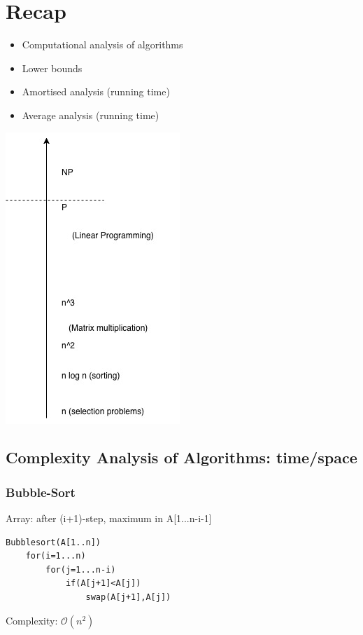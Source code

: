\section{Recap}
\begin{itemize}
\item Computational analysis of algorithms
\item  Lower bounds
\item  Amortised analysis (running time)
\item  Average analysis (running time)
\end{itemize}
\begin{center}
	\includegraphics[scale=0.5]{img/laufzeiten}
\end{center}


\subsection{Complexity Analysis of Algorithms: time/space}
\subsubsection{Bubble-Sort}

Array: after (i+1)-step, maximum in A[1...n-i-1]

\begin{verbatim}
Bubblesort(A[1..n])
    for(i=1...n)
        for(j=1...n-i)
            if(A[j+1]<A[j])
                swap(A[j+1],A[j])
\end{verbatim}
Complexity: $\mathcal{O}(n^2)$

